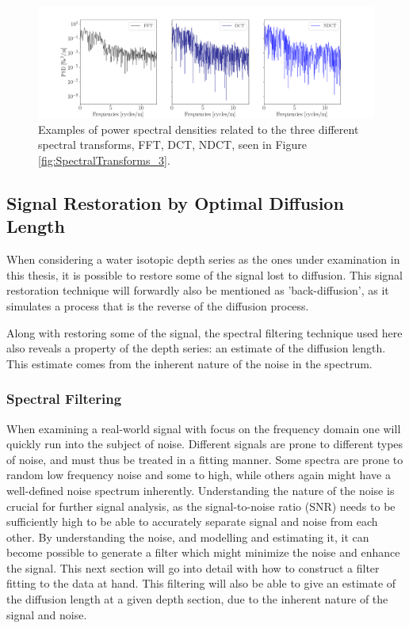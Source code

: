 \documentclass[../../CompleteThesis2/Complete_2ndDraft]{subfiles}
\begin{document}
\begin{figure}[h]
	\centering
	\includegraphics[width=\textwidth]{SpectralTransforms_PSD.png}
	\caption[FFT, DCT, NDCT PSDs, Site A]{\small Examples of power spectral densities related to the three different spectral transforms, FFT, DCT, NDCT, seen in Figure \ref{fig:SpectralTransforms_3}.}
	\label{fig:SpectralTransforms_PSD}
\end{figure}







\subsection[Signal Restoration][Signal Restoration]{Signal Restoration by Optimal Diffusion Length}
\label{Subsec:SignalAnalysis_BackDiffusion_SignalRestoration}
When considering a water isotopic depth series as the ones under examination in this thesis, it is possible to restore some of the signal lost to diffusion. This signal restoration technique will forwardly also be mentioned as 'back-diffusion', as it simulates a process that is the reverse of the diffusion process.

Along with restoring some of the signal, the spectral filtering technique used here also reveals a property of the depth series: an estimate of the diffusion length. This estimate comes from the inherent nature of the noise in the spectrum.

\subsubsection[Spectral Filtering][Spectral Filtering]{Spectral Filtering}
\label{Subsubsec:SignalAnalysis_BackDiffusion_SpectralFiltering}


When examining a real-world signal with focus on the frequency domain one will quickly run into the subject of noise. Different signals are prone to different types of noise, and must thus be treated in a fitting manner. Some spectra are prone to random low frequency noise and some to high, while others again might have a well-defined noise spectrum inherently. Understanding the nature of the noise is crucial for further signal analysis, as the signal-to-noise ratio (SNR) needs to be sufficiently high to be able to accurately separate signal and noise from each other. By understanding the noise, and modelling and estimating it, it can become possible to generate a filter which might minimize the noise and enhance the signal. This next section will go into detail with how to construct a filter fitting to the data at hand. This filtering will also be able to give an estimate of the diffusion length at a given depth section, due to the inherent nature of the signal and noise.
\end{document}
